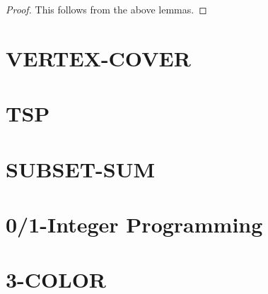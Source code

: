 \begin{proof}
  This follows from the above lemmas.
\end{proof}

\section{VERTEX-COVER}

\section{TSP}

\section{SUBSET-SUM}

\section{0/1-Integer Programming}

\section{3-COLOR}

